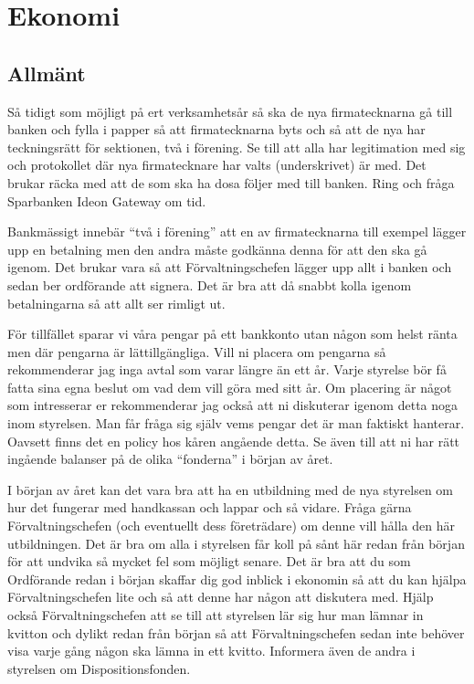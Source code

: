 \documentclass[10pt]{article}
\begin{document}
    \section{Ekonomi}
    
    \subsection{Allmänt}
    
    Så tidigt som möjligt på ert verksamhetsår så ska de nya firmatecknarna gå till banken och fylla i papper så att firmatecknarna byts och så att de nya har teckningsrätt för sektionen, två i förening. Se till att alla har legitimation med sig och protokollet där nya firmatecknare har valts (underskrivet) är med. Det brukar räcka med att de som ska ha dosa följer med till banken. Ring och fråga Sparbanken Ideon Gateway om tid.
    
    Bankmässigt innebär ``två i förening'' att en av firmatecknarna till exempel lägger upp en betalning men den andra måste godkänna denna för att den ska gå igenom. Det brukar vara så att Förvaltningschefen lägger upp allt i banken och sedan ber ordförande att signera. Det är bra att då snabbt kolla igenom betalningarna så att allt ser rimligt ut.
    
    För tillfället sparar vi våra pengar på ett bankkonto utan någon som helst ränta men där pengarna är lättillgängliga. Vill ni placera om pengarna så rekommenderar jag inga avtal som varar längre än ett år. Varje styrelse bör få fatta sina egna beslut om vad dem vill göra med sitt år. Om placering är något som intresserar er rekommenderar jag också att ni diskuterar igenom detta noga inom styrelsen. Man får fråga sig själv vems pengar det är man faktiskt hanterar. Oavsett finns det en policy hos kåren angående detta. Se även till att ni har rätt ingående balanser på de olika ``fonderna'' i början av året.
    
    I början av året kan det vara bra att ha en utbildning med de nya styrelsen om hur det fungerar med handkassan och lappar och så vidare. Fråga gärna Förvaltningschefen (och eventuellt dess företrädare) om denne vill hålla den här utbildningen. Det är bra om alla i styrelsen får koll på sånt här redan från början för att undvika så mycket fel som möjligt senare. Det är bra att du som Ordförande redan i början skaffar dig god inblick i ekonomin så att du kan hjälpa Förvaltningschefen lite och så att denne har någon att diskutera med. Hjälp också Förvaltningschefen att se till att styrelsen lär sig hur man lämnar in kvitton och dylikt redan från början så att Förvaltningschefen sedan inte behöver visa varje gång någon ska lämna in ett kvitto. Informera även de andra i styrelsen om Dispositionsfonden.
    
\end{document}
